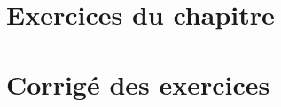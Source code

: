 \section{Exercices du chapitre}
\small

\setcounter{numexos}{0}
\normalsize
\section{Corrigé des exercices}
\small

\normalsize
\restoregeometry
\captionsetup{width=0.9\linewidth}
